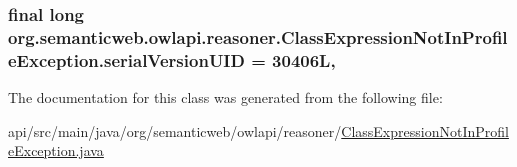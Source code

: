 \hypertarget{classorg_1_1semanticweb_1_1owlapi_1_1reasoner_1_1_class_expression_not_in_profile_exception_a6cc1037ef2c2a17eda4a181cb93c2141}{
\subsubsection[{serial\-Version\-U\-I\-D}]{\setlength{\rightskip}{0pt plus 5cm}final long org.\-semanticweb.\-owlapi.\-reasoner.\-Class\-Expression\-Not\-In\-Profile\-Exception.\-serial\-Version\-U\-I\-D = 30406\-L\hspace{0.3cm}{\ttfamily [static]}, {\ttfamily [private]}}}\label{classorg_1_1semanticweb_1_1owlapi_1_1reasoner_1_1_class_expression_not_in_profile_exception_a6cc1037ef2c2a17eda4a181cb93c2141}


The documentation for this class was generated from the following file\-:\begin{DoxyCompactItemize}
\item 
api/src/main/java/org/semanticweb/owlapi/reasoner/\hyperlink{_class_expression_not_in_profile_exception_8java}{Class\-Expression\-Not\-In\-Profile\-Exception.\-java}\end{DoxyCompactItemize}
